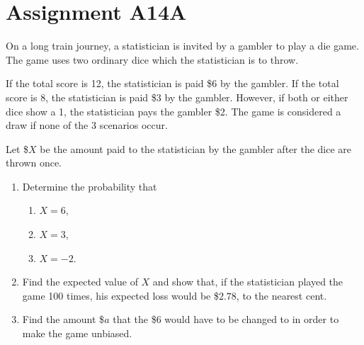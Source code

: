 \section{Assignment A14A}

\begin{problem}
    On a long train journey, a statistician is invited by a gambler to play a die game. The game uses two ordinary dice which the statistician is to throw.

    If the total score is 12, the statistician is paid \$6 by the gambler. If the total score is 8, the statistician is paid \$3 by the gambler. However, if both or either dice show a 1, the statistician pays the gambler \$2. The game is considered a draw if none of the 3 scenarios occur.

    Let \$$X$ be the amount paid to the statistician by the gambler after the dice are thrown once.

    \begin{enumerate}
        \item Determine the probability that
        \begin{enumerate}
            \item $X = 6$,
            \item $X = 3$,
            \item $X = -2$.
        \end{enumerate}
        \item Find the expected value of $X$ and show that, if the statistician played the game 100 times, his expected loss would be \$$2.78$, to the nearest cent.
        \item Find the amount \$$a$ that the \$6 would have to be changed to in order to make the game unbiased.
    \end{enumerate}
\end{problem}
